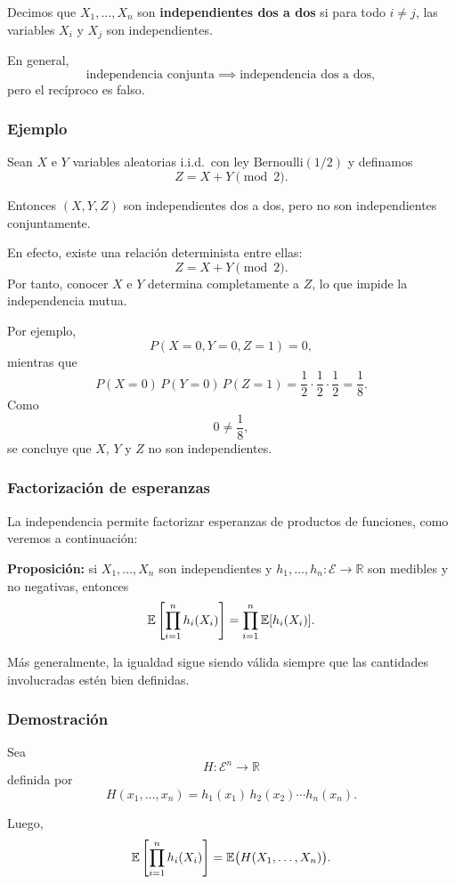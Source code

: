 Decimos que $X_1,\dots,X_n$ son \textbf{independientes dos a dos} si para todo $i\neq j$, las variables $X_i$ y $X_j$ son independientes.

En general,
\[
\text{independencia conjunta} \implies \text{independencia dos a dos},
\]
pero el recíproco es falso.

\subsubsection*{Ejemplo}

Sean $X$ e $Y$ variables aleatorias i.i.d.\ con ley $\mathrm{Bernoulli}(1/2)$ y definamos
\[
Z = X+Y \pmod 2.
\]

Entonces $(X,Y,Z)$ son independientes dos a dos, pero no son independientes conjuntamente.

En efecto, existe una relación determinista entre ellas:
\[
Z = X+Y \pmod 2.
\]
Por tanto, conocer $X$ e $Y$ determina completamente a $Z$, lo que impide la independencia mutua.

Por ejemplo,
\[
P(X=0,Y=0,Z=1)=0,
\]
mientras que
\[
P(X=0)\,P(Y=0)\,P(Z=1)
=
\frac12\cdot\frac12\cdot\frac12
=
\frac18.
\]
Como
\[
0\neq \frac18,
\]
se concluye que $X$, $Y$ y $Z$ no son independientes.

\subsubsection*{Factorización de esperanzas}

La independencia permite factorizar esperanzas de productos de funciones, como veremos a continuación:

\textbf{Proposición:} si $X_1,\dots,X_n$ son independientes y $h_1,\dots,h_n:\mathcal{E}\to\mathbb{R}$ son medibles y no negativas, entonces
\[
\mathbb{E}\left[\prod_{i=1}^n h_i(X_i)\right]
=
\prod_{i=1}^n \mathbb{E}[h_i(X_i)].
\]

Más generalmente, la igualdad sigue siendo válida siempre que las cantidades involucradas estén bien definidas.

\medskip

\noindent
\subsubsection*{Demostración}

Sea
\[
H:\mathcal{E}^n \to \mathbb{R}
\]
definida por
\[
H(x_1,\dots,x_n)=h_1(x_1)\,h_2(x_2)\cdots h_n(x_n).
\]

Luego,
\[
\mathbb{E}\left[\prod_{i=1}^n h_i(X_i)\right]
=
\mathbb{E}\big(H(X_1,\dots,X_n)\big).
\]

